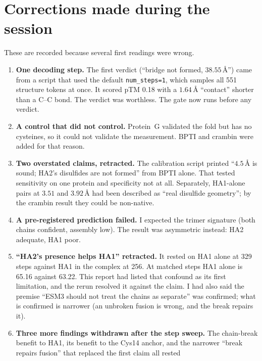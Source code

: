\documentclass[11pt,a4paper]{article}
\newcommand{\ang}{\,\mbox{\AA}}
\begin{document}
\section{Corrections made during the session}
\label{sec:corrections}

These are recorded because several first readings were wrong.

\begin{enumerate}
\item \textbf{One decoding step.} The first verdict (``bridge not formed,
  $38.55\ang$'') came from a script that used the default
  \texttt{num\_steps=1}, which samples all 551 structure tokens at once. It
  scored pTM 0.18 with a $1.64\ang$ ``contact'' shorter than a C--C bond.
  The verdict was worthless. The gate now runs before any verdict.
\item \textbf{A control that did not control.} Protein~G validated the fold
  but has no cysteines, so it could not validate the measurement. BPTI and
  crambin were added for that reason.
\item \textbf{Two overstated claims, retracted.} The calibration script
  printed ``$4.5\ang$ is sound; HA2's disulfides are not formed'' from BPTI
  alone. That tested sensitivity on one protein and specificity not at all.
  Separately, HA1-alone pairs at $3.51$ and $3.92\ang$ had been described as
  ``real disulfide geometry''; by the crambin result they could be
  non-native.
\item \textbf{A pre-registered prediction failed.} I expected the trimer
  signature (both chains confident, assembly low). The result was
  asymmetric instead: HA2 adequate, HA1 poor.
\item \textbf{``HA2's presence helps HA1'' retracted.} It rested on HA1
  alone at 329 steps against HA1 in the complex at 256. At matched steps HA1
  alone is 65.16 against 63.22. This report had listed that confound as its
  first limitation, and the rerun resolved it against the claim. I had also
  said the premise ``ESM3 should not treat the chains as separate'' was
  confirmed; what is confirmed is narrower (an unbroken fusion is wrong, and
  the break repairs it).
\item \textbf{Three more findings withdrawn after the step sweep.} The
  chain-break benefit to HA1, its benefit to the Cys14 anchor, and the
  narrower ``break repairs fusion'' that replaced the first claim all rested

\end{enumerate}
\end{document}
